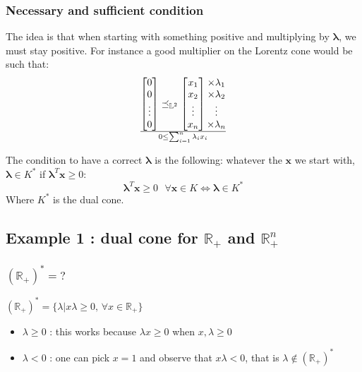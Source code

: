 \documentclass[11pt,a4paper]{article}
\begin{document}
\subsubsection*{Necessary and sufficient condition}
The idea is that when starting with something positive and multiplying by $\boldsymbol{\lambda}$, we must stay positive. For instance a good multiplier on the Lorentz cone would be such that:
\[\begin{bmatrix}
 0\\
 0\\
 \vdots\\
 0
\end{bmatrix} \preceq_{\mathbb{L}^2} \begin{bmatrix}
x_1\\
x_2\\
\vdots\\
x_n
\end{bmatrix}\begin{matrix}
 \times \lambda_1\\
 \times \lambda_2\\
 \vdots\\
 \times \lambda_n
\end{matrix}\over
0 \leq \sum_{i=1}^{n}\lambda_ix_i\]

The condition to have a correct $\boldsymbol{\lambda}$ is the following: whatever the $\boldsymbol{x}$ we start with, $\boldsymbol{\lambda} \in K^*$ if $\boldsymbol{\lambda}^T\boldsymbol{x} \geq 0$:
\[\boldsymbol{\lambda}^T\boldsymbol{x}\geq 0 \textrm{  } \forall \boldsymbol{x} \in K \Leftrightarrow \boldsymbol{\lambda} \in K^* \]
Where $K^*$ is the dual cone.


\subsection*{Example 1 : dual cone for $\mathbb{R}_+$ and $\mathbb{R}_+^n$}
\subsubsection*{$(\mathbb{R}_+)^*=?$}
$(\mathbb{R}_+)^*=\{\lambda | x \lambda \geq 0\textrm{, } \forall x \in \mathbb{R}_+ \}$
\begin{itemize}
\item $\lambda \geq 0$ : this works because $\lambda x \geq 0$ when $x,\lambda \geq 0$
\item $\lambda < 0$ : one can pick $x=1$ and observe that $x \lambda<0$, that is $\lambda \notin (\mathbb{R}_+)^*$
\end{itemize}
\end{document}

